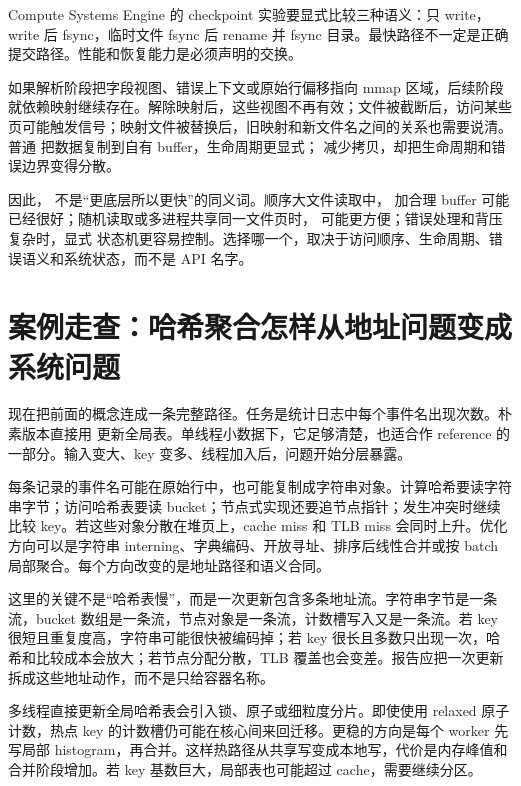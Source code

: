 Compute Systems Engine 的 checkpoint 实验要显式比较三种语义：只 write，write 后 fsync，临时文件 fsync 后 rename 并 fsync 目录。最快路径不一定是正确提交路径。性能和恢复能力是必须声明的交换。

如果解析阶段把字段视图、错误上下文或原始行偏移指向 mmap 区域，后续阶段就依赖映射继续存在。解除映射后，这些视图不再有效；文件被截断后，访问某些页可能触发信号；映射文件被替换后，旧映射和新文件名之间的关系也需要说清。普通  把数据复制到自有 buffer，生命周期更显式； 减少拷贝，却把生命周期和错误边界变得分散。

因此， 不是“更底层所以更快”的同义词。顺序大文件读取中， 加合理 buffer 可能已经很好；随机读取或多进程共享同一文件页时， 可能更方便；错误处理和背压复杂时，显式  状态机更容易控制。选择哪一个，取决于访问顺序、生命周期、错误语义和系统状态，而不是 API 名字。

\section{案例走查：哈希聚合怎样从地址问题变成系统问题}

现在把前面的概念连成一条完整路径。任务是统计日志中每个事件名出现次数。朴素版本直接用  更新全局表。单线程小数据下，它足够清楚，也适合作 reference 的一部分。输入变大、key 变多、线程加入后，问题开始分层暴露。

每条记录的事件名可能在原始行中，也可能复制成字符串对象。计算哈希要读字符串字节；访问哈希表要读 bucket；节点式实现还要追节点指针；发生冲突时继续比较 key。若这些对象分散在堆页上，cache miss 和 TLB miss 会同时上升。优化方向可以是字符串 interning、字典编码、开放寻址、排序后线性合并或按 batch 局部聚合。每个方向改变的是地址路径和语义合同。

这里的关键不是“哈希表慢”，而是一次更新包含多条地址流。字符串字节是一条流，bucket 数组是一条流，节点对象是一条流，计数槽写入又是一条流。若 key 很短且重复度高，字符串可能很快被编码掉；若 key 很长且多数只出现一次，哈希和比较成本会放大；若节点分配分散，TLB 覆盖也会变差。报告应把一次更新拆成这些地址动作，而不是只给容器名称。

多线程直接更新全局哈希表会引入锁、原子或细粒度分片。即使使用 relaxed 原子计数，热点 key 的计数槽仍可能在核心间来回迁移。更稳的方向是每个 worker 先写局部 histogram，再合并。这样热路径从共享写变成本地写，代价是内存峰值和合并阶段增加。若 key 基数巨大，局部表也可能超过 cache，需要继续分区。

